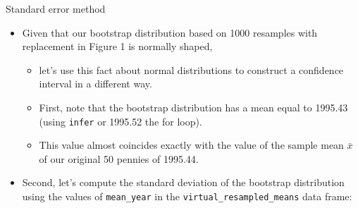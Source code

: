 \documentclass[
  ignorenonframetext,
]{beamer}
\begin{document}
\begin{frame}[fragile]{Standard error method}
\protect\hypertarget{standard-error-method}{}
\begin{itemize}
\item
  Given that our bootstrap distribution based on 1000 resamples with
  replacement in Figure 1 is normally shaped,

  \begin{itemize}
  \item
    let's use this fact about normal distributions to construct a
    confidence interval in a different way.
  \item
    First, note that the bootstrap distribution has a mean equal to
    1995.43 (using \texttt{infer} or 1995.52 the for loop).
  \item
    This value almost coincides exactly with the value of the sample
    mean \(\bar{x}\) of our original 50 pennies of 1995.44.
  \end{itemize}
\item
  Second, let's compute the standard deviation of the bootstrap
  distribution using the values of \texttt{mean\_year} in the
  \texttt{virtual\_resampled\_means} data frame:
\end{itemize}
\end{frame}
\end{document}
